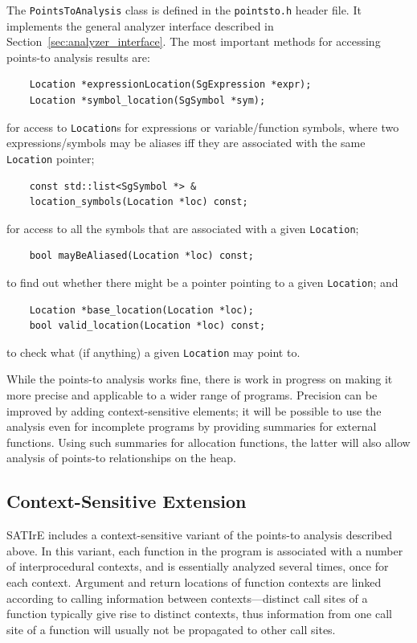 \documentclass[a4paper,12pt]{report}
\begin{document}
The \texttt{PointsToAnalysis} class is defined in the \verb|pointsto.h|
header file. It implements the general analyzer interface described in
Section~\ref{sec:analyzer_interface}. The most important methods for
accessing points-to analysis results are:
\begin{verbatim}
    Location *expressionLocation(SgExpression *expr);
    Location *symbol_location(SgSymbol *sym);
\end{verbatim}
for access to \texttt{Location}s for expressions or variable/function
symbols, where two expressions/symbols may be aliases iff they are
associated with the same \texttt{Location} pointer;
\begin{verbatim}
    const std::list<SgSymbol *> &
    location_symbols(Location *loc) const;
\end{verbatim}
for access to all the symbols that are associated with a given
\texttt{Location};
\begin{verbatim}
    bool mayBeAliased(Location *loc) const;
\end{verbatim}
to find out whether there might be a pointer pointing to a given
\texttt{Location}; and
\begin{verbatim}
    Location *base_location(Location *loc);
    bool valid_location(Location *loc) const;
\end{verbatim}
to check what (if anything) a given \texttt{Location} may point to.

While the points-to analysis works fine, there is work in progress on making
it more precise and applicable to a wider range of programs. Precision can
be improved by adding context-sensitive elements; it will be possible to use
the analysis even for incomplete programs by providing summaries for
external functions. Using such summaries for allocation functions, the
latter will also allow analysis of points-to relationships on the heap.

\subsection{Context-Sensitive Extension}

SATIrE includes a context-sensitive variant of the points-to analysis
described above. In this variant, each function in the program is associated
with a number of interprocedural contexts, and is essentially analyzed
several times, once for each context. Argument and return locations of
function contexts are linked according to calling information between
contexts---distinct call sites of a function typically give rise to distinct
contexts, thus information from one call site of a function will usually not
be propagated to other call sites.
\end{document}
